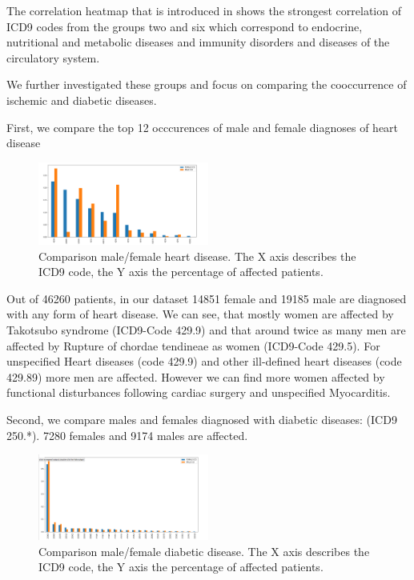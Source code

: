 \documentclass[11pt, a4paper]{book}
\begin{document}
The correlation heatmap that is introduced in \citep{arya2019exploratory}
shows the strongest correlation of ICD9 codes from the groups two and six which correspond to endocrine, nutritional and metabolic diseases and immunity disorders and diseases of the circulatory system.

We further investigated  these groups and focus on comparing the cooccurrence of ischemic and diabetic diseases. 

First, we compare the top 12 occcurences of male and female diagnoses of heart disease

\begin{figure}
  \begin{center}
  \includegraphics[width=0.5\textwidth]{img/male_female_heart_disease.png}
  \caption{Comparison male/female heart disease. The X axis describes the ICD9 code, the Y axis the percentage of affected patients.}
  \label{fig:heart_disease_comparison}
  \end{center}
\end{figure}

Out of 46260 patients, in our dataset 14851 female and 19185 male are diagnosed with any form of heart disease. We can see, that mostly women are affected by Takotsubo syndrome (ICD9-Code 429.9) and that around twice as many men are affected by Rupture of chordae tendineae as women (ICD9-Code 429.5). For unspecified Heart diseases (code 429.9) and other ill-defined heart diseases (code 429.89) more men are affected.  However we can find more women affected by functional disturbances following cardiac surgery and unspecified Myocarditis. 

Second, we compare males and females diagnosed with diabetic diseases: (ICD9 250.*). 7280 females and 9174 males are affected.

\begin{figure}
  \begin{center}
  \includegraphics[width=0.5\textwidth]{img/comparison_diabetic.png}
  \caption{Comparison male/female diabetic disease. The X axis describes the ICD9 code, the Y axis the percentage of affected patients.}
  \label{fig:diabetic_comparison}
  \end{center}
\end{figure}
\end{document}
